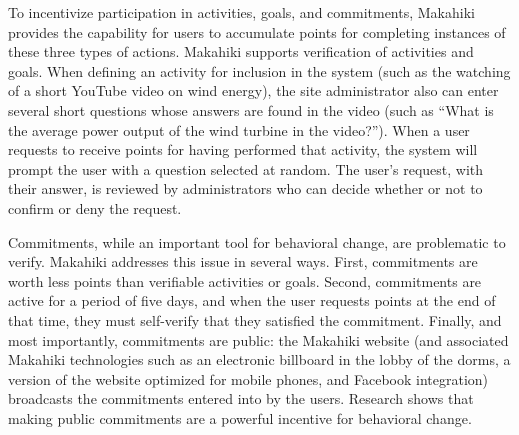 To incentivize participation in activities, goals, and commitments,
Makahiki provides the capability for users to accumulate points for
completing instances of these three types of actions.  Makahiki supports
verification of activities and goals. When defining an activity for
inclusion in the system (such as the watching of a short YouTube video on
wind energy), the site administrator also can enter several short questions
whose answers are found in the video (such as ``What is the average power
output of the wind turbine in the video?'').  When a user requests to
receive points for having performed that activity, the system will prompt
the user with a question selected at random.  The user's request, with
their answer, is reviewed by administrators who can decide whether or not
to confirm or deny the request.  

Commitments, while an important tool for behavioral change, are problematic
to verify.  Makahiki addresses this issue in several ways.  First,
commitments are worth less points than verifiable activities or goals.
Second, commitments are active for a period of five days, and when the user
requests points at the end of that time, they must self-verify that they
satisfied the commitment.  Finally, and most importantly, commitments are
public: the Makahiki website (and associated Makahiki technologies such as an
electronic billboard in the lobby of the dorms, a version of the website
optimized for mobile phones, and Facebook integration) broadcasts the
commitments entered into by the users. Research shows that making public
commitments are a powerful incentive for behavioral change.